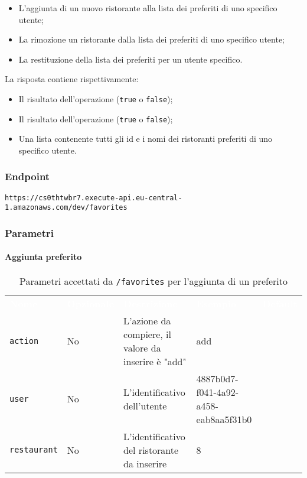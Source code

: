 \begin{itemize}
	\item L'aggiunta di un nuovo ristorante alla lista dei preferiti di uno specifico utente;
    \item La rimozione un ristorante dalla lista dei preferiti di uno specifico utente;
    \item La restituzione della lista dei preferiti per un utente specifico.
\end{itemize}


La risposta contiene rispettivamente:
\begin{itemize}
	\item Il risultato dell'operazione (\texttt{true} o \texttt{false});
    \item Il risultato dell'operazione (\texttt{true} o \texttt{false});
    \item Una lista contenente tutti gli id e i nomi dei ristoranti preferiti di uno specifico utente.
\end{itemize}

\subsubsection{Endpoint}
\texttt{https://cs0thtwbr7.execute-api.eu-central-1.amazonaws.com/dev/favorites}

\subsubsection{Parametri}

\paragraph{Aggiunta preferito}
\begin{table}[!htbp]
\renewcommand{\arraystretch}{1.5}

\begin{tabular}[t]{ m{}<{\centering}  m{}<{\centering} m{}<{\centering} m{}<{\centering}  m{}<{\centering} }
	\rowcolor{darkblue}
	\textcolor{white}{\textbf{Nome}} &\textcolor{white}{\textbf{Opzionale}} &\textcolor{white}{\textbf{Descrizione}} &\textcolor{white}{\textbf{Esempio}} &\textcolor{white}{\textbf{Default}} \\ 
\texttt{action} & No & L'azione da compiere, il valore da inserire è "add"  & add &  \\
\texttt{user} & No & L'identificativo dell'utente  & 4887b0d7-f041-4a92-a458-eab8aa5f31b0 &  \\
\texttt{restaurant} & No & L'identificativo del ristorante da inserire  & 8 &  \\
\end{tabular}
\caption{Parametri accettati da \texttt{/favorites} per l'aggiunta di un preferito}
\end{table}


